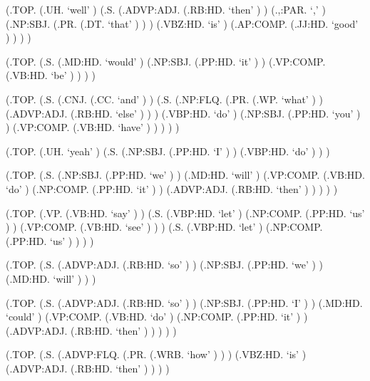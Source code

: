 \documentclass[10pt]{article}
\begin{document}
\begin{parsetree}  (.TOP. (.UH. `well' ) (.S. (.ADVP:ADJ. (.RB:HD. `then' ) ) (.,:PAR. `,' ) (.NP:SBJ. (.PR. (.DT. `that' ) ) ) (.VBZ:HD. `is' ) (.AP:COMP. (.JJ:HD. `good' ) ) ) ) \end{parsetree}

\begin{parsetree}  (.TOP. (.S. (.MD:HD. `would' ) (.NP:SBJ. (.PP:HD. `it' ) ) (.VP:COMP. (.VB:HD. `be' ) ) ) ) \end{parsetree}

\begin{parsetree}  (.TOP. (.S. (.CNJ. (.CC. `and' ) ) (.S. (.NP:FLQ. (.PR. (.WP. `what' ) ) (.ADVP:ADJ. (.RB:HD. `else' ) ) ) (.VBP:HD. `do' ) (.NP:SBJ. (.PP:HD. `you' ) ) (.VP:COMP. (.VB:HD. `have' ) ) ) ) ) \end{parsetree}

\begin{parsetree}  (.TOP. (.UH. `yeah' ) (.S. (.NP:SBJ. (.PP:HD. `I' ) ) (.VBP:HD. `do' ) ) ) \end{parsetree}

\begin{parsetree}  (.TOP. (.S. (.NP:SBJ. (.PP:HD. `we' ) ) (.MD:HD. `will' ) (.VP:COMP. (.VB:HD. `do' ) (.NP:COMP. (.PP:HD. `it' ) ) (.ADVP:ADJ. (.RB:HD. `then' ) ) ) ) ) \end{parsetree}

\begin{parsetree}  (.TOP. (.VP. (.VB:HD. `say' ) ) (.S. (.VBP:HD. `let' ) (.NP:COMP. (.PP:HD. `us' ) ) (.VP:COMP. (.VB:HD. `see' ) ) ) (.S. (.VBP:HD. `let' ) (.NP:COMP. (.PP:HD. `us' ) ) ) ) \end{parsetree}

\begin{parsetree}  (.TOP. (.S. (.ADVP:ADJ. (.RB:HD. `so' ) ) (.NP:SBJ. (.PP:HD. `we' ) ) (.MD:HD. `will' ) ) ) \end{parsetree}

\begin{parsetree}  (.TOP. (.S. (.ADVP:ADJ. (.RB:HD. `so' ) ) (.NP:SBJ. (.PP:HD. `I' ) ) (.MD:HD. `could' ) (.VP:COMP. (.VB:HD. `do' ) (.NP:COMP. (.PP:HD. `it' ) ) (.ADVP:ADJ. (.RB:HD. `then' ) ) ) ) ) \end{parsetree}

\begin{parsetree}  (.TOP. (.S. (.ADVP:FLQ. (.PR. (.WRB. `how' ) ) ) (.VBZ:HD. `is' ) (.ADVP:ADJ. (.RB:HD. `then' ) ) ) ) \end{parsetree}
\end{document}
